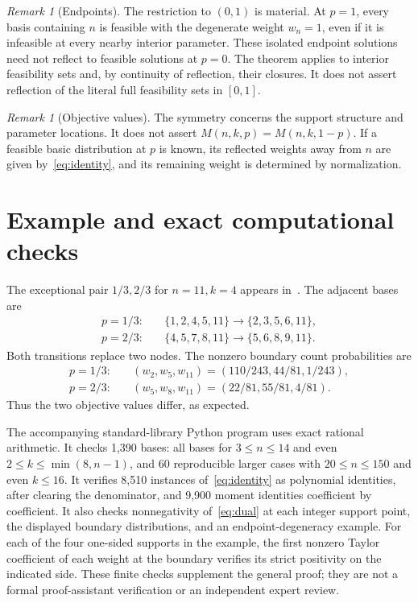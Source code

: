 \documentclass[11pt]{article}
\theoremstyle{remark}
\newtheorem{remark}[theorem]{Remark}
\begin{document}
\begin{remark}[Endpoints]
The restriction to $(0,1)$ is material. At $p=1$, every basis containing $n$ is feasible with the degenerate weight $w_n=1$, even if it is infeasible at every nearby interior parameter. These isolated endpoint solutions need not reflect to feasible solutions at $p=0$. The theorem applies to interior feasibility sets and, by continuity of reflection, their closures. It does not assert reflection of the literal full feasibility sets in $[0,1]$.
\end{remark}

\begin{remark}[Objective values]
The symmetry concerns the support structure and parameter locations. It does not assert $M(n,k,p)=M(n,k,1-p)$. If a feasible basic distribution at $p$ is known, its reflected weights away from $n$ are given by~\eqref{eq:identity}, and its remaining weight is determined by normalization.
\end{remark}

\section{Example and exact computational checks}

The exceptional pair $1/3,2/3$ for $n=11,k=4$ appears in~\cite[Table 3]{BEKK}. The adjacent bases are
\begin{align*}
 p=1/3:&\quad \{1,2,4,5,11\}\longrightarrow\{2,3,5,6,11\},\\
 p=2/3:&\quad \{4,5,7,8,11\}\longrightarrow\{5,6,8,9,11\}.
\end{align*}
Both transitions replace two nodes. The nonzero boundary count probabilities are
\begin{align*}
 p=1/3:&\quad (w_2,w_5,w_{11})=(110/243,44/81,1/243),\\
 p=2/3:&\quad (w_5,w_8,w_{11})=(22/81,55/81,4/81).
\end{align*}
Thus the two objective values differ, as expected.

The accompanying standard-library Python program uses exact rational arithmetic. It checks 1,390 bases: all bases for $3\le n\le14$ and even $2\le k\le\min(8,n-1)$, and 60 reproducible larger cases with $20\le n\le150$ and even $k\le16$. It verifies 8,510 instances of~\eqref{eq:identity} as polynomial identities, after clearing the denominator, and 9,900 moment identities coefficient by coefficient. It also checks nonnegativity of~\eqref{eq:dual} at each integer support point, the displayed boundary distributions, and an endpoint-degeneracy example. For each of the four one-sided supports in the example, the first nonzero Taylor coefficient of each weight at the boundary verifies its strict positivity on the indicated side. These finite checks supplement the general proof; they are not a formal proof-assistant verification or an independent expert review.
\end{document}
